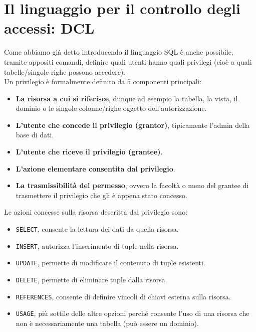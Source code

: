 \documentclass[12pt]{report}
\begin{document}
	\section{Il linguaggio per il controllo degli accessi: DCL}
	Come abbiamo già detto introducendo il linguaggio SQL è anche possibile, tramite appositi comandi, definire quali utenti hanno quali privilegi (cioè a quali tabelle/singole righe possono accedere).\\
	Un privilegio è formalmente definito da 5 componenti principali:
	\begin{itemize}
		\item \textbf{La risorsa a cui si riferisce}, dunque ad esempio la tabella, la vista, il dominio o le singole colonne/righe oggetto dell'autorizzazione.
		
		\item \textbf{L'utente che concede il privilegio (grantor)}, tipicamente l'admin della base di dati.
		
		\item \textbf{L'utente che riceve il privilegio (grantee)}.
		
		\item \textbf{L'azione elementare consentita dal privilegio}.
		
		\item \textbf{La trasmissibilità del permesso}, ovvero la facoltà o meno del grantee di trasmettere il privilegio che gli è appena stato concesso.
	\end{itemize}
	
	Le azioni concesse sulla risorsa descritta dal privilegio sono:
	\begin{itemize}
		\item \texttt{SELECT}, consente la lettura dei dati da quella risorsa.
		
		\item \texttt{INSERT}, autorizza l'inserimento di tuple nella risorsa.
		
		\item \texttt{UPDATE}, permette di modificare il contenuto di tuple esistenti.
		
		\item \texttt{DELETE}, permette di eliminare tuple dalla risorsa.
		
		\item \texttt{REFERENCES}, consente di definire vincoli di chiavi esterna sulla risorsa.
		
		\item \texttt{USAGE}, più sottile delle altre opzioni perché consente l'uso di una risorsa che non è necessariamente una tabella (può essere un dominio).
	\end{itemize}
	
\end{document}
